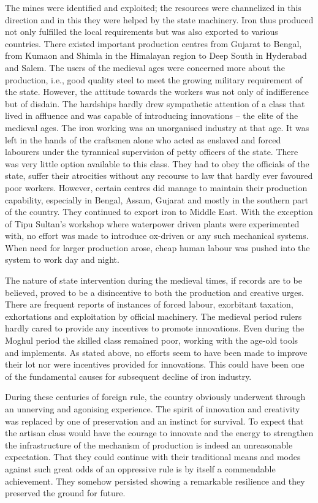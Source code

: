 The mines were identified and exploited; the resources were channelized in this direction and in this they were helped by the state machinery. Iron thus produced not only fulfilled the local requirements but was also exported to various countries. There existed important production centres from Gujarat to Bengal, from Kumaon and Shimla in the Himalayan region to Deep South in Hyderabad and Salem. The users of the medieval ages were concerned more about the production, i.e., good quality steel to meet the growing military requirement of the state. However, the attitude towards the workers was not only of indifference but of disdain. The hardships hardly drew sympathetic attention of a class that lived in affluence and was capable of introducing innovations – the elite of the medieval ages. The iron working was an unorganised industry at that age. It was left in the hands of the craftsmen alone who acted as enslaved and forced labourers under the tyrannical supervision of petty officers of the state. There was very little option available to this class. They had to obey the officials of the state, suffer their atrocities without any recourse to law that hardly ever favoured poor workers. However, certain centres did manage to maintain their production capability, especially in Bengal, Assam, Gujarat and mostly in the southern part of the country. They continued to export iron to Middle East. With the exception of Tipu Sultan's workshop where waterpower driven plants were experimented with, no effort was made to introduce ox-driven or any such mechanical systems. When need for larger production arose, cheap human labour was pushed into the system to work day and night. 

The nature of state intervention during the medieval times, if records are to be believed, proved to be a disincentive to both the production and creative urges. There are frequent reports of instances of forced labour, exorbitant taxation, exhortations and exploitation by official machinery. The medieval period rulers hardly cared to provide any incentives to promote innovations. Even during the Moghul period the skilled class remained poor, working with the age-old tools and implements. As stated above, no efforts seem to have been made to improve their lot nor were incentives provided for innovations. This could have been one of the fundamental causes for subsequent decline of iron industry.

During these centuries of foreign rule, the country obviously underwent through an unnerving and agonising experience. The spirit of innovation and creativity was replaced by one of preservation and an instinct for survival. To expect that the artisan class would have the courage to innovate and the energy to strengthen the infrastructure of the mechanism of production is indeed an unreasonable expectation. That they could continue with their traditional means and modes against such great odds of an oppressive rule is by itself a commendable achievement. They somehow persisted showing a remarkable resilience and they preserved the ground for future.  

